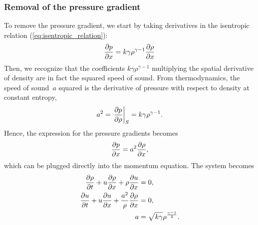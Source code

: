 \documentclass[../../thesis.tex]{subfiles}
\begin{document}
\subsubsection*{Removal of the pressure gradient}
To remove the pressure gradient, we start by taking derivatives in the isentropic relation (\ref{eq:isentropic_relation}):
\begin{equation}
    \pdv{p}{x} = k \gamma \rho^{\gamma-1} \pdv{\rho}{x}
\end{equation}
Then, we recognize that the coefficients $k \gamma \rho^{\gamma-1}$ multiplying the spatial derivative of density are in fact the squared speed of sound.
From thermodynamics, the speed of sound~$a$ squared is the derivative of pressure with respect to density at constant entropy,
\begin{equation}
    a^2 = \left.\pdv{p}{\rho}\right|_S = k \gamma \rho^{\gamma-1}.
\end{equation}
Hence, the expression for the pressure gradients becomes
\begin{equation}
    \pdv{p}{x} = a^2 \pdv{\rho}{x},
\end{equation}
which can be plugged directly into the momentum equation. 
The system becomes
\begin{subequations}
\begin{align}
        \pdv{\rho}{t} + u \pdv{\rho}{x} + \rho \pdv{u}{x} &= 0, \\ 
        \pdv{u}{t} + u \pdv{u}{x} + \frac{a^2}{\rho}\pdv{\rho}{x} &= 0, \\
        a &= \sqrt{k \gamma} \rho^{\frac{\gamma-1}{2}}. 
\end{align}
\end{subequations}
\end{document}
